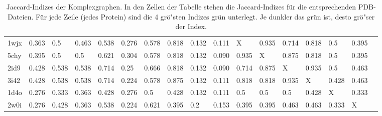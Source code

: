 \documentclass{report}
\begin{document}
\begin{table}
{\begin{tabular}{l l l l l l l l l l l l l l l l l}
1wjx & 0.363 & 0.5 & 0.463 & 0.538 & 0.276 & 0.578 & \cellcolor{fGreen!50}0.818 & 0.132 & 0.111 &   X   & \cellcolor{fGreen!100}0.935 & \cellcolor{fGreen!25}0.714 & \cellcolor{fGreen!75}0.818 & 0.5 & 0.395 &  \\
5chy & 0.395 & 0.5 & 0.5 & 0.621 & 0.304 & 0.578 & \cellcolor{fGreen!25}0.818 & 0.132 & 0.090 & \cellcolor{fGreen!100}0.935 &   X   & \cellcolor{fGreen!75}0.875 & \cellcolor{fGreen!50}0.818 & 0.5 & 0.395 &  \\
2id9 & 0.428 & 0.538 & 0.538 & 0.714 & 0.25 & 0.666 & \cellcolor{fGreen!50}0.818 & 0.132 & 0.090 & \cellcolor{fGreen!25}0.714 & \cellcolor{fGreen!75}0.875 &   X   & \cellcolor{fGreen!100}0.935 & 0.5 & 0.463 &  \\
3i42 & 0.428 & 0.538 & 0.538 & 0.714 & 0.224 & 0.578 & \cellcolor{fGreen!75}0.875 & 0.132 & 0.111 & \cellcolor{fGreen!25}0.818 & \cellcolor{fGreen!50}0.818 & \cellcolor{fGreen!100}0.935 &   X   & 0.428 & 0.463 &  \\
1d4o & 0.276 & 0.333 & 0.363 & 0.428 & 0.276 & \cellcolor{fGreen!100}0.5 & 0.428 & 0.132 & 0.111 & \cellcolor{fGreen!50}0.5 & \cellcolor{fGreen!25}0.5 & \cellcolor{fGreen!75}0.5 & 0.428 &   X   & 0.333 &  \\
2w0i & 0.276 & 0.428 & 0.363 & \cellcolor{fGreen!75}0.538 & 0.224 & \cellcolor{fGreen!100}0.621 & 0.395 & 0.2 & 0.153 & 0.395 & 0.395 & \cellcolor{fGreen!25}0.463 & \cellcolor{fGreen!50}0.463 & 0.333 &   X   &  \\

\end{tabular}}
\caption{Jaccard-Indizes der Komplexgraphen. In den Zellen der Tabelle stehen die Jaccard-Indizes f\"ur die entsprechenden PDB-Dateien. F\"ur jede Zeile (jedes Protein) sind die 4 gr\"o"sten Indizes gr\"un unterlegt. Je dunkler das gr\"un ist, desto gr\"o"ser der Index.}
\label{table:occ-cg-tc}

\end{table}





\end{document}
